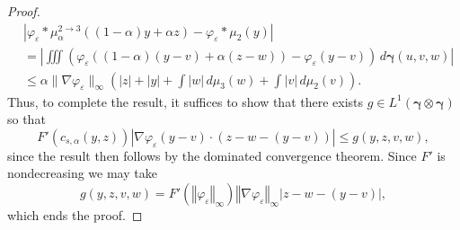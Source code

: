 \documentclass[11pt,leqno]{amsart}
\theoremstyle{definition}
\newcommand{\bes}{\begin{equation*}}
\newcommand{\ees}{\end{equation*}}
\newcommand{\norm}[1]{\left\Vert#1\right\Vert}
\newcommand{\grad}{\nabla}
\def\e{\varepsilon}
\newcommand{\bgamma}{\boldsymbol{\gamma}}
\begin{document}
\begin{proof}
\begin{align*} 
	&\left|\varphi_\e * \mu_\alpha^{2\to3}((1-\alpha)y +\alpha z) - \varphi_\e * \mu_2(y) \right|\\
	&= \left|\iiint \left(\varphi_\e((1-\alpha)(y-v) + \alpha (z - w)) - \varphi_\e(y-v) \right) \,d \bgamma(u,v,w) \right|\\
	& \leq \alpha \|\grad \varphi_\e\|_\infty \left( |z|+|y| + \int |w| \,d\mu_3(w) + \int |v| \,d\mu_2(v) \right).
\end{align*}
Thus, to complete the result, it suffices to show that there exists $g \in L^1(\bgamma \otimes \bgamma)$ so that 
\[
	F'(c_{s,\alpha}(y,z)) \left| \grad \varphi_\e(y-v) \cdot (z-w-(y-v))  \right| \leq g(y,z,v,w),
\]
since the result then follows by the dominated convergence theorem. Since $F'$ is nondecreasing we may take
\bes
	g(y,z,v,w) = F'\left(\norm{\varphi_\e}_\infty\right) \norm{\grad \varphi_\e}_\infty |z-w-(y-v)|, 
\ees
which ends the proof.
\end{proof}
\end{document}

